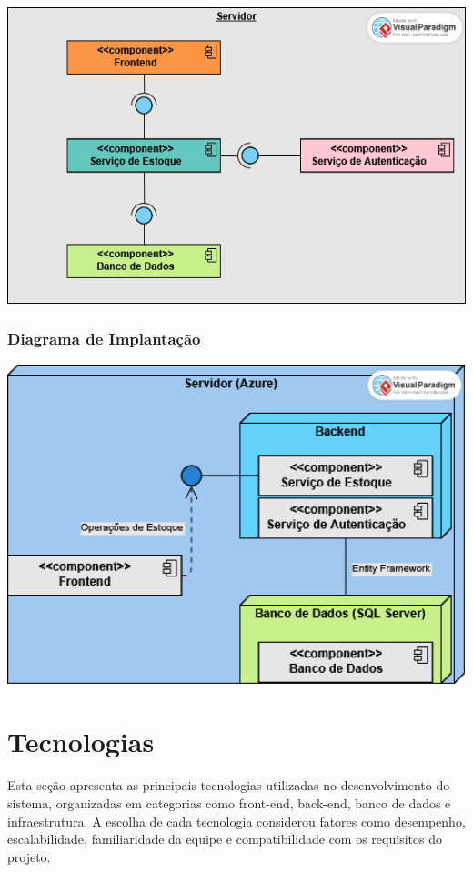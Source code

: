 \documentclass[
	12pt,				%
	openany,			%
	twoside,			%
	a4paper,			%
	english,			%
	brazil				%
	]{abntex2}
\begin{document}
\includegraphics[width=1.0\textwidth]{Figuras/Componentes.png}


\subsubsection{Diagrama de Implantação}


\includegraphics[width=1.0\textwidth]{Figuras/Implantação.png}



\section{Tecnologias}

Esta seção apresenta as principais tecnologias utilizadas no desenvolvimento do sistema, organizadas em categorias como front-end, back-end, banco de dados e infraestrutura. A escolha de cada tecnologia considerou fatores como desempenho, escalabilidade, familiaridade da equipe e compatibilidade com os requisitos do projeto.
\end{document}
